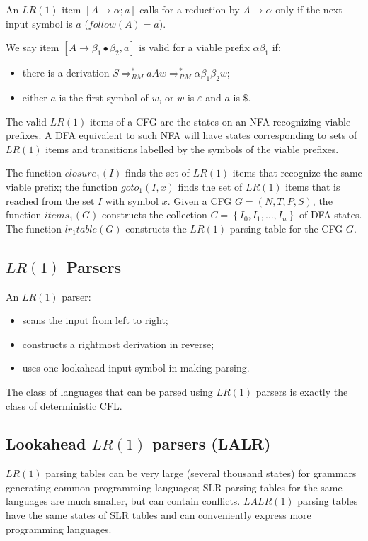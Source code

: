 An $LR(1)$ item $[A \to \alpha; a]$ calls for a reduction by $A \to \alpha$ only if the next input symbol is $a$ ($follow(A) = a$).

We say item $[A \to \beta_1 \bullet \beta_2, a]$ is valid for a viable prefix $\alpha\beta_1$ if:
\begin{itemize}
	\item there is a derivation $S \Rightarrow^\ast_{RM} aAw \Rightarrow^\ast_{RM} \alpha\beta_1\beta_2w$;
	\item either $a$ is the first symbol of $w$, or $w$ is $\varepsilon$ and $a$ is $\$$.
\end{itemize}
The valid $LR(1)$ items of a CFG are the states on an NFA recognizing viable prefixes.
A DFA equivalent to such NFA will have states corresponding to sets of $LR(1)$ items and transitions labelled by the symbols of the viable prefixes.

The function $closure_1(I)$ finds the set of $LR(1)$ items that recognize the same viable prefix; the function $goto_1(I, x)$ finds the set of $LR(1)$ items that is reached from the set $I$ with symbol $x$.
Given a CFG $G = (N, T, P, S)$, the function $items_1(G)$ constructs the collection $C = \left\{I_0, I_1, \ldots, I_n\right\}$ of DFA states.
The function $lr_1table(G)$ constructs the $LR(1)$ parsing table for the CFG $G$.

\subsection{$LR(1)$ Parsers}
An $LR(1)$ parser:
\begin{itemize}
	\item scans the input from left to right;
	\item constructs a rightmost derivation in reverse;
	\item uses one lookahead input symbol in making parsing.
\end{itemize}
The class of languages that can be parsed using $LR(1)$ parsers is exactly the class of deterministic CFL.

\subsection{Lookahead $LR(1)$ parsers (LALR)}
$LR(1)$ parsing tables can be very large (several thousand states) for grammars generating common programming languages; SLR parsing tables for the same languages are much smaller, but can contain \underline{conflicts}.
$LALR(1)$ parsing tables have the same states of SLR tables and can conveniently express more programming languages.

